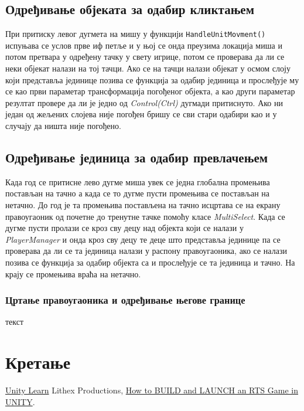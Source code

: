 \documentclass[11pt,a4paper]{report}
\begin{document}
\subsection{Одређивање објеката за одабир кликтањем}
При притиску левог дугмета на мишу у функцији \texttt{HandleUnitMovment()} испуњава се услов прве иф петље и у њој се онда преузима локација миша и потом претвара у  одређену тачку у свету игрице, потом се проверава да ли се неки објекат налази на тој тачци. Ако се на тачци налази објекат у осмом слоју који представља јединице позива се функција за одабир јединица и прослеђује му се као први параметар трансформација погођеног објекта, а као други параметар резултат провере да ли је једно од \emph{Control(Ctrl)} дугмади притиснуто. Ако ни један од жељених слојева није погођен бришу се сви стари одабири као и у случају да ништа није погођено. 

\subsection{Одређивање јединица за одабир превлачењем}
Када год се притисне лево дугме миша увек се једна глобална промењива постављан на тачно а када се то дугме пусти промењива се постављан на нетачно. До год је та промењива постављена на тачно исцртава се на екрану правоугаоник од почетне до тренутне тачке помоћу класе \emph{MultiSelect}. Када се дугме пусти пролази се кроз сву децу над објекта који се налази у \emph{PlayerManager} и онда кроз сву децу те деце што представља јединице па се проверава да ли се та јединица налази у распону правоугаоника, ако се налази позива се функција за одабир објекта са и прослеђује се та јединица и тачно. На крају се промењива враћа на нетачно.

\subsubsection{Цртање правоугаоника и одређивање његове границе}
текст 

\section{Кретање}


\begin{thebibliography}{9}
\href{https://learn.unity.com/}{Unity Learn}
   Lithex Productions, \href{https://www.youtube.com/watch?v=oVM_ugro6Mw&list=PLQPhaRCbpx5U0kcamApy727XC0v1bF0PK&index=1}{How to BUILD and LAUNCH an RTS Game in UNITY}.
\end{thebibliography}
\end{document}
